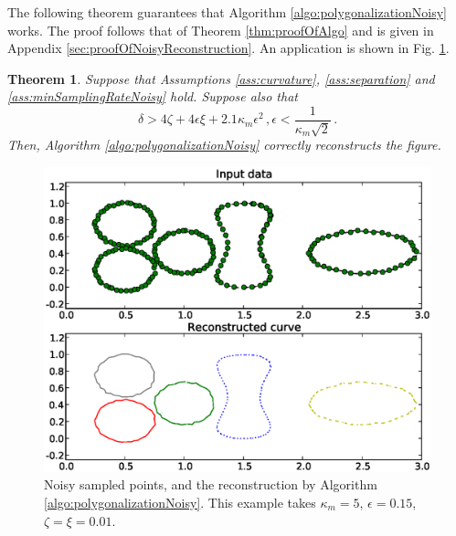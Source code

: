 \documentclass{article}
\newtheorem{theorem}[cntr]{Theorem}
\numberwithin{cntr}{section}
\numberwithin{equation}{section}
\newcommand{\curvemax}{{\kappa_{m}}}
\newcommand{\curvesep}{{\delta}}
\newcommand{\pointNoise}{{\zeta}}
\newcommand{\tanNoise}{{\xi}}
\begin{document}
The following theorem
guarantees that Algorithm \ref{algo:polygonalizationNoisy} works.
The proof follows that of Theorem \ref{thm:proofOfAlgo}
and is given in Appendix \ref{sec:proofOfNoisyReconstruction}.
An application is shown in Fig. \ref{fig:noisyreconstruction}.

\begin{theorem}
  \label{thm:noisyReconstruction}
  Suppose that Assumptions \ref{ass:curvature}, \ref{ass:separation} and \ref{ass:minSamplingRateNoisy} hold. Suppose also that
  \begin{subequations}
    \label{eq:noisySeparationConditions}
    \begin{equation}
      \label{eq:noisySeparationDistance}
      \curvesep > 4 \pointNoise + 4 \epsilon \tanNoise + 2.1 \curvemax \epsilon^{2} \, ,
    \end{equation}
    \begin{equation}
      \label{eq:noisyConstraintOnkmaxEpsilon}
      \epsilon < \frac{1}{ \curvemax \sqrt{2}} \, .
    \end{equation}
  \end{subequations}
  Then, Algorithm \ref{algo:polygonalizationNoisy} correctly reconstructs
the figure.
\end{theorem}

\begin{figure}
\setlength{\unitlength}{0.240900pt}
\ifx\plotpoint\undefined\newsavebox{\plotpoint}\fi
\sbox{\plotpoint}{\rule[-0.200pt]{0.400pt}{0.400pt}}%
\includegraphics[scale=0.50]{noisy_reconstruction.eps}
\caption{Noisy sampled points, and the reconstruction by Algorithm \ref{algo:polygonalizationNoisy}. This example takes $\curvemax=5$, $\epsilon=0.15$, $\pointNoise=\tanNoise=0.01$. }
\label{fig:noisyreconstruction}
\end{figure}
\end{document}
